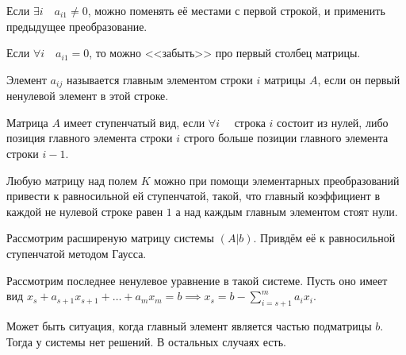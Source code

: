     Если $\exists{i}\quad a_{i1} \neq 0$, можно поменять её местами с первой строкой, и применить предыдущее преобразование.

    Если $\forall{i}\quad a_{i1} = 0$, то можно <<забыть>> про первый столбец матрицы.

\begin{definition} \thmslashn 

Элемент $a_{ij}$ называется главным элементом строки $i$ матрицы $A$, если он первый ненулевой элемент в этой строке.
\end{definition}
\begin{definition} \thmslashn 

Матрица $A$ имеет ступенчатый вид, если $\forall{i}\quad $ строка $i$ состоит из нулей, либо позиция главного элемента строки $i$ строго больше позиции главного элемента строки $i-1$.
\end{definition}
\begin{theorem} \thmslashn

    Любую матрицу над полем $K$ можно при помощи элементарных преобразований привести к равносильной ей ступенчатой, такой, что главный коэффициент в каждой не нулевой строке равен $1$ а над каждым главным элементом стоят нули.
\end{theorem}

Рассмотрим расширеную матрицу системы $(A|b)$. Привдём её к равносильной ступенчатой методом Гаусса.

Рассмотрим последнее ненулевое уравнение в такой системе. Пусть оно имеет вид $x_{s} + a_{s+1}x_{s+1} + \ldots + a_{m}x_{m} = b \implies x_{s} = b - \sum\limits_{i=s+1}^{m} a_{i}x_{i}$.

Может быть ситуация, когда главный элемент является частью подматрицы $b$. Тогда у системы нет решений. В остальных случаях есть.

